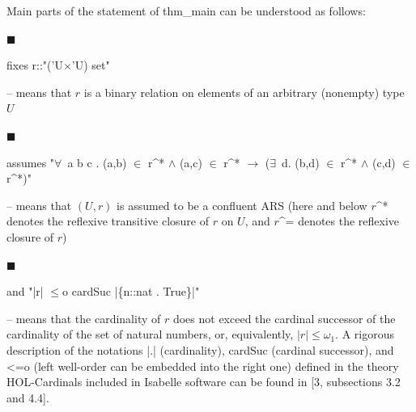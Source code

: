 
  
 
  
 
 
Main parts of the statement of thm\_main can be understood as follows:\par
  
\par\noindent  $\blacksquare$ 
 
fixes r::"(’U$\times$’U) set"\par
 
 
 
– means that $r$ is a binary relation on elements of an arbitrary (nonempty) type $U$\par
 
 
 
\par\noindent  $\blacksquare$ 
 
assumes "$\forall\,$ a b c . (a,b) $\in$ r\textasciicircum{}* $\wedge$ (a,c) $\in$ r\textasciicircum{}* $\longrightarrow$ ($\exists\,$ d. (b,d) $\in$ r\textasciicircum{}* $\wedge$ (c,d) $\in$ r\textasciicircum{}*)"\par
 
 
 
– means that $(U,r)$ is assumed to be a confluent ARS (here and below $r$\textasciicircum{}* denotes the reflexive transitive closure of $r$ on $U$, and $r$\textasciicircum{}= denotes the reflexive closure of $r$)\par
 
 
 
\par\noindent  $\blacksquare$ 
 
and "|r| $\leq$o cardSuc |\{n::nat . True\}|"\par
 
 
 
– means that the cardinality of $r$ does not exceed the cardinal successor of the cardinality of the set of natural numbers, or, equivalently, $|r|\leq\omega_{1}$. A rigorous description of the notations |.| (cardinality), cardSuc (cardinal successor), and <=o (left well-order can be embedded into the right one) defined in the theory HOL-Cardinals included in Isabelle software can be found in [3, subsections 3.2 and 4.4].\par
 
